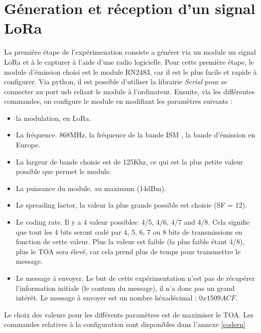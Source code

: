 \newpage

\section{Géneration et réception d'un signal LoRa} \label{signallora}

La première étape de l'expérimenation consiste a générer via un module un signal LoRa et à le capturer à l'aide d'une radio logicielle. Pour cette première étape, le module d'émission choisi est le module RN2483, car il est le plus facile et rapide à configurer.
Via python, il est possible d'utiliser la librairie \textit{Serial} pour se connecter au port usb reliant le module à l'ordinateur. Ensuite, via les différentes commandes, on configure le module en modifiant les paramètres suivants : 

\vspace{0.1cm}

\begin{itemize}
\item la modulation, en LoRa.
\item La fréquence. 868MHz, la fréquence de la bande ISM , la bande d'émission en Europe.
\item La largeur de bande choisie est de 125Khz, ce qui est la plus petite valeur possible que permet le module.
\item La puissance du module, au maximum (14dBm).
\item Le spreading factor, la valeur la plus grande possible est choisie (SF = 12).
\item Le coding rate. Il y a 4 valeur possibles: 4/5, 4/6, 4/7 and 4/8. Cela signifie que tout les 4 bits seront codé par 4, 5, 6, 7 ou 8 bits de transmissions en fonction de cette valeur. Plus la valeur est faible (la plus faible étant 4/8), plus le TOA sera élevé, car cela prend plus de temps pour transmettre le message.
\item Le message à envoyer. Le but de cette expérimentation n'est pas de récupérer l'information initiale (le contenu du message), il n'a donc pas un grand intérêt. Le message à envoyer est un nombre héxadécimal : $0x1509ACF$.
\end{itemize}

\vspace{0.1cm}

Le choix des valeurs pour les différents paramètres est de maximiser le TOA. Les commandes relatives à la configuration sont disponibles dans l'annexe \ref{codern}

